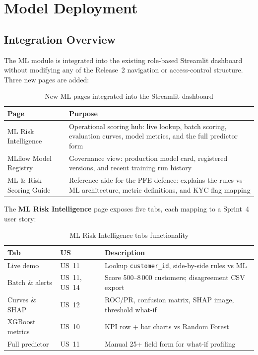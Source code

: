 \section{Model Deployment}
\label{sec:phase5_streamlit}

\subsection{Integration Overview}

The ML module is integrated into the existing role-based Streamlit dashboard
without modifying any of the Release~2 navigation or access-control structure.
Three new pages are added:

\begin{table}[H]
\centering
\caption{New ML pages integrated into the Streamlit dashboard}
\label{tab:streamlit-ml-pages}
\begin{tabular}{|p{4.5cm}|p{9cm}|}
\hline
\textbf{Page} & \textbf{Purpose} \\
\hline
ML Risk Intelligence & Operational scoring hub: live lookup, batch scoring, evaluation curves, model metrics, and the full predictor form \\
MLflow Model Registry & Governance view: production model card, registered versions, and recent training run history \\
ML \& Risk Scoring Guide & Reference aide for the PFE defence: explains the rules-vs-ML architecture, metric definitions, and KYC flag mapping \\
\hline
\end{tabular}
\end{table}

The \textbf{ML Risk Intelligence} page exposes five tabs, each mapping to a
Sprint~4 user story:

\begin{table}[H]
\centering
\caption{ML Risk Intelligence tabs functionality}
\label{tab:ml-tabs}
\begin{tabular}{|l|l|p{7cm}|}
\hline
\textbf{Tab} & \textbf{US} & \textbf{Description} \\
\hline
Live demo & US~11 & Lookup \texttt{customer\_id}, side-by-side rules vs ML \\
Batch \& alerts & US~11, US~14 & Score 500--8\,000 customers; disagreement CSV export \\
Curves \& SHAP & US~12 & ROC/PR, confusion matrix, SHAP image, threshold what-if \\
XGBoost metrics & US~10 & KPI row + bar charts vs Random Forest \\
Full predictor & US~11 & Manual 25+ field form for what-if profiling \\
\hline
\end{tabular}
\end{table}

